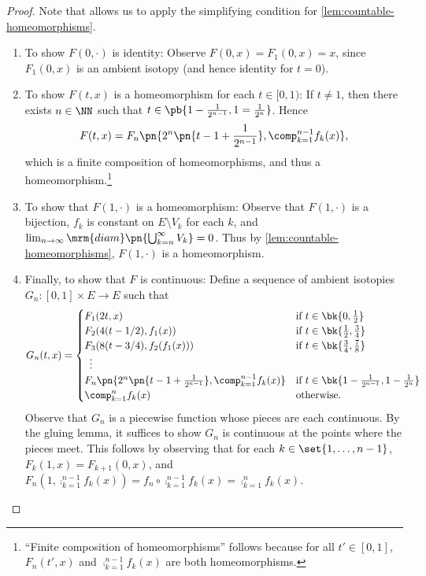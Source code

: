 \begin{proof}
  Note that  allows us to apply the simplifying condition for
  \cref{lem:countable-homeomorphisms}.
  \begin{enumerate}
    \item To show $F(0, \cdot)$ is identity: Observe $F(0, x) = F_1(0,
      x) = x$, since $F_1(0,x)$ is an ambient isotopy (and hence
      identity for $t=0$).
    \item To show $F(t, x)$ is a homeomorphism for each $t\in [0, 1)$:
      If $t \neq 1$, then there exists $n \in \NN$ such that $t \in
      \pb{1 - \frac{1}{2^{n-1}}, 1 = \frac{1}{2^n}}$. Hence
      \[
      F(t, x) = F_n\pn{2^n \pn{t - 1 + \frac{1}{2^{n-1}}},
      \comp_{k=1}^{n-1} f_k(x)},
      \]
      which is a finite composition of
      homeomorphisms, and thus a homeomorphism.\footnote{``Finite
      composition of homeomorphisms'' follows because for all $t' \in
      [0,1]$, $F_n(t', x)$ and $\comp_{k=1}^{n-1} f_k(x)$ are both
      homeomorphisms.}
    \item To show that $F(1, \cdot)$ is a homeomorphism: Observe that
      $F(1, \cdot)$ is a bijection, $f_k$ is constant on $E
      \setminus V_k$ for each $k$, and $\lim_{n\to\infty} \mrm{diam}
      \pn{\bigcup_{k=n}^\infty V_k} = 0$. Thus by
      \cref{lem:countable-homeomorphisms}, $F(1, \cdot)$ is a
      homeomorphism.
    \item Finally, to show that $F$ is continuous: Define a sequence
      of ambient isotopies $G_n : [0,1] \times E \to E$ such that
      \[
      G_n(t, x) =
      \begin{cases}
        F_1(2t, x) & \text{if } t \in \bk{0, \frac{1}{2}} \\
        F_2(4 (t - 1/2), f_1(x)) & \text{if } t \in \bk{\frac{1}{2},
          \frac{3}{4}} \\
        F_3(8 (t - 3/4), f_2(f_1(x))) & \text{if } t \in
        \bk{\frac{3}{4}, \frac{7}{8}} \\
        \hspace{.5em} \vdots & \\
        F_n\pn{2^n \pn{t - 1 + \frac{1}{2^{n-1}}}, \comp_{k=1}^{n-1}
          f_k(x)} & \text{if } t\in \bk{1 - \frac{1}{2^{n-1}}, 1 -
          \frac{1}{2^n}} \\
        \comp_{k=1}^n f_k(x) & \text{otherwise.}
      \end{cases}
      \]
      Observe that $G_n$ is a piecewise function whose pieces are each
      continuous. By the gluing lemma, it suffices to show $G_n$ is
      continuous at the points where the pieces meet. This follows by
      observing that for each $k \in \set{1, \ldots, n-1}$, $F_k(1,
      x) = F_{k+1}(0, x)$, and $F_n(1, \comp_{k=1}^{n-1}f_k(x)) = f_n
      \circ \comp_{k=1}^{n-1}f_k(x) = \comp_{k=1}^n f_k(x)$.


\end{enumerate}
\end{proof}
